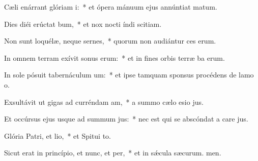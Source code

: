 \item Cæli enárrant glóriam i:~* et ópera mánuum ejus annúntiat matum.
\item Dies diéi erúctat bum,~* et nox nocti índi scitiam.
\item Non sunt loquélæ, neque sernes,~* quorum non audiántur ces erum.
\item In omnem terram exívit sonus erum:~* et in fines orbis terræ ba erum.
\item In sole pósuit tabernáculum um:~* et ipse tamquam sponsus procédens de lamo o.
\item Exsultávit ut gigas ad curréndam am,~* a summo cælo esio jus.
\item Et occúrsus ejus usque ad summum jus:~* nec est qui se abscóndat a care jus.
\item Glória Patri, et lio,~* et Spitui to.
\item Sicut erat in princípio, et nunc, et per,~* et in sǽcula sæcurum. men.
